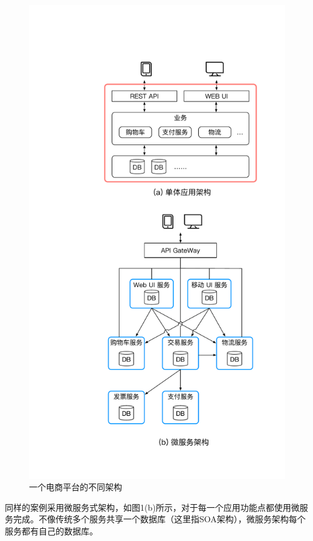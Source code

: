 \documentclass[10.5pt,twocolumn]{jbuaa}
\begin{document}
\begin{figure}[H]
\centering
\includegraphics [scale=0.4,trim=0 0 0 0]{./image/1.pdf}
\caption{一个电商平台的不同架构}
\end{figure}

同样的案例采用微服务式架构，如图1(b)所示，对于每一个应用功能点都使用微服务完成。不像传统多个服务共享一个数据库（这里指SOA架构），微服务架构每个服务都有自己的数据库。
\end{document}
